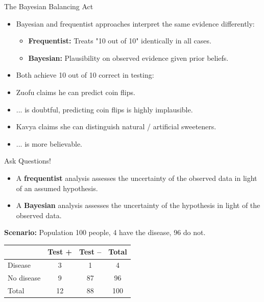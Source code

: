 \documentclass[12pt]{beamer}
\newcommand{\vocab}[1]{\textcolor{AggieMaroon}{\textbf{#1}}}
\begin{document}
\begin{frame}{}
\begin{block}{The Bayesian Balancing Act}
\begin{itemize}
\item Bayesian and frequentist approaches interpret the same evidence differently:
\begin{itemize}
\item \vocab{Frequentist:} Treats "10 out of 10" identically in all cases.
\item \vocab{Bayesian:} Plausibility on observed evidence given prior beliefs.
\end{itemize}
\end{itemize}
\end{block}

\begin{itemize}
\item[] Both achieve 10 out of 10 correct in testing:
\item Zuofu claims he can predict coin flips.
\item[] ... is doubtful, predicting coin flips is highly implausible.
\item Kavya claims she can distinguish natural / artificial sweeteners.
\item[] ... is more believable.
\end{itemize}

\end{frame}

\begin{frame}{}
\begin{block}{Ask Questions!}
\begin{itemize}
\item A \vocab{frequentist} analysis assesses the uncertainty of the observed data in light of an assumed hypothesis.
\item A \vocab{Bayesian} analysis assesses the uncertainty of the hypothesis in light of the observed data.
\end{itemize}
\end{block}

\vspace{.2cm}

\vocab{Scenario:} Population 100 people, 4 have the disease, 96 do not.
        \begin{center}
        \begin{tabular}{lccc}
        \hline
         & \vocab{Test +} & \vocab{Test --} & \vocab{Total} \\
        \hline
        Disease & 3 & 1 & 4 \\
        No disease & 9 & 87 & 96 \\
        \hline
        Total & 12 & 88 & 100 \\
        \hline
        \end{tabular}
        \end{center}
\end{frame}
\end{document}
